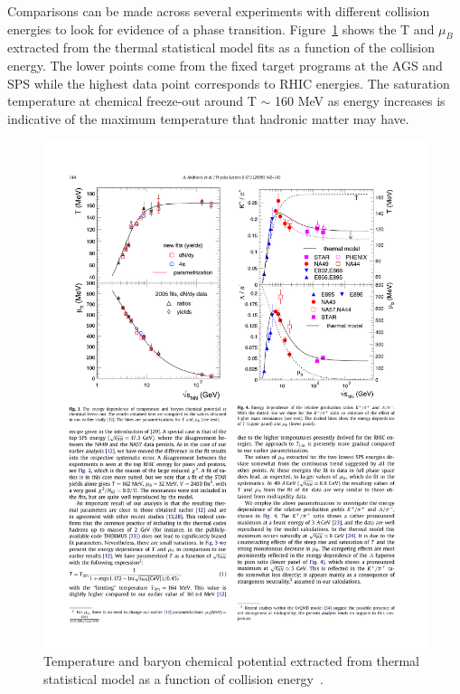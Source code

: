 Comparisons can be made across several experiments with different collision energies to look for evidence of a phase transition. Figure~\ref{fig:T_mu} shows the T and $\mu_B$ extracted from the thermal statistical model fits as a function of the collision energy. The lower points come from the fixed target programs at the AGS and SPS while the highest data point corresponds to RHIC energies. The saturation temperature at chemical freeze-out around T $\sim$ 160 MeV as energy increases is indicative of the maximum temperature that hadronic matter may have.

\begin{figure}[htbp]
\begin{center}
\includegraphics[scale=1.3]{Plots/Intro/freezeout.pdf}
\end{center}
\caption[Freeze-out T and $\mu_B$]{Temperature and baryon chemical potential extracted from thermal statistical model as a function of collision energy~\cite{thermstat}.}
\label{fig:T_mu}
\end{figure}

